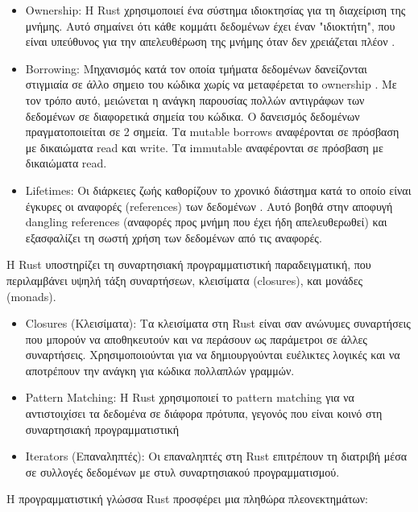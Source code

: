 \begin{itemize}
\item Ownership: Η Rust χρησιμοποιεί ένα σύστημα ιδιοκτησίας για τη διαχείριση της μνήμης. Αυτό σημαίνει ότι κάθε κομμάτι δεδομένων έχει έναν "ιδιοκτήτη", που είναι υπεύθυνος για την απελευθέρωση της μνήμης όταν δεν χρειάζεται πλέον \cite{rust2}.
\item Borrowing: Μηχανισμός κατά τον οποία τμήματα δεδομένων δανείζονται στιγμιαία σε άλλο σημειο του κώδικα χωρίς να μεταφέρεται το ownership \cite{rust1}. Με τον τρόπο αυτό, μειώνεται η ανάγκη παρουσίας πολλών αντιγράφων των δεδομένων σε διαφορετικά σημεία του κώδικα. Ο δανεισμός δεδομένων πραγματοποιείται σε 2 σημεία. Τα mutable borrows αναφέρονται σε πρόσβαση με δικαιώματα read και write. Τα immutable αναφέρονται σε πρόσβαση με δικαιώματα read.
\item Lifetimes: Οι διάρκειες ζωής καθορίζουν το χρονικό διάστημα κατά το οποίο είναι έγκυρες οι αναφορές (references) των δεδομένων \cite{rust2}. Αυτό βοηθά στην αποφυγή dangling references (αναφορές προς μνήμη που έχει ήδη απελευθερωθεί) και εξασφαλίζει τη σωστή χρήση των δεδομένων από τις αναφορές.
\end{itemize}

Η Rust υποστηρίζει τη συναρτησιακή προγραμματιστική παραδειγματική, που περιλαμβάνει υψηλή τάξη συναρτήσεων, κλεισίματα (closures), και μονάδες (monads).

\begin{itemize}
\item Closures (Κλεισίματα): Τα κλεισίματα στη Rust είναι σαν ανώνυμες συναρτήσεις που μπορούν να αποθηκευτούν και να περάσουν ως παράμετροι σε άλλες συναρτήσεις. Χρησιμοποιούνται για να δημιουργούνται ευέλικτες λογικές και να αποτρέπουν την ανάγκη για κώδικα πολλαπλών γραμμών.
\item Pattern Matching: Η Rust χρησιμοποιεί το pattern matching για να αντιστοιχίσει τα δεδομένα σε διάφορα πρότυπα, γεγονός που είναι κοινό στη συναρτησιακή προγραμματιστική
\item Iterators (Επαναληπτές): Οι επαναληπτές στη Rust επιτρέπουν τη διατριβή μέσα σε συλλογές δεδομένων με στυλ συναρτησιακού προγραμματισμού.
\end{itemize}

Η προγραμματιστική γλώσσα Rust προσφέρει μια πληθώρα πλεονεκτημάτων:

